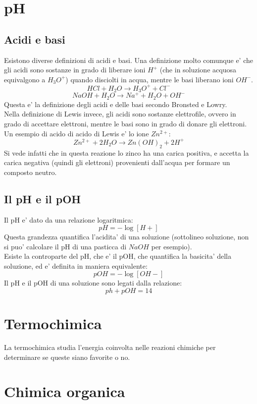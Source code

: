 \documentclass[12pt]{article}
\begin{document}
\section{pH}
\subsection{Acidi e basi}
Esistono diverse definizioni di acidi e basi. Una definizione molto comunque e' che gli acidi sono sostanze in grado di liberare ioni $H^+$ (che in soluzione acquosa equivalgono a $H_3O^+$) quando disciolti in acqua, mentre le basi liberano ioni $OH^-$.
$$
	HCl + H_2O \rightarrow H_3O^+ + Cl^-
$$
$$
	NaOH + H_2O \rightarrow Na^+ + H_2O + OH^-
$$
Questa e' la definizione degli acidi e delle basi secondo Bronsted e Lowry. \\
Nella definizione di Lewis invece, gli acidi sono sostanze elettrofile, ovvero in grado di accettare elettroni, mentre le basi sono in grado di donare gli elettroni. Un esempio di acido di acido di Lewis e' lo ione $Zn^{2+}$:
$$
	Zn^{2+} + 2H_2O \rightarrow Zn(OH)_2 + 2H^+
$$
Si vede infatti che in questa reazione lo zinco ha una carica positiva, e accetta la carica negativa (quindi gli elettroni) provenienti dall'acqua per formare un composto neutro.
\subsection{Il pH e il pOH}
Il pH e' dato da una relazione logaritmica:
$$
	pH = -\log[H+]
$$
Questa grandezza quantifica l'acidita' di una soluzione (sottolineo soluzione, non si puo' calcolare il pH di una pasticca di $NaOH$ per esempio). \\
Esiste la controparte del pH, che e' il pOH, che quantifica la basicita' della soluzione, ed e' definita in maniera equivalente:
$$
	pOH = -\log[OH-]
$$
Il pH e il pOH di una soluzione sono legati dalla relazione:
$$
	ph + pOH = 14
$$
\section{Termochimica}
La termochimica studia l'energia coinvolta nelle reazioni chimiche per determinare se queste siano favorite o no. 

\section{Chimica organica}
\end{document}
